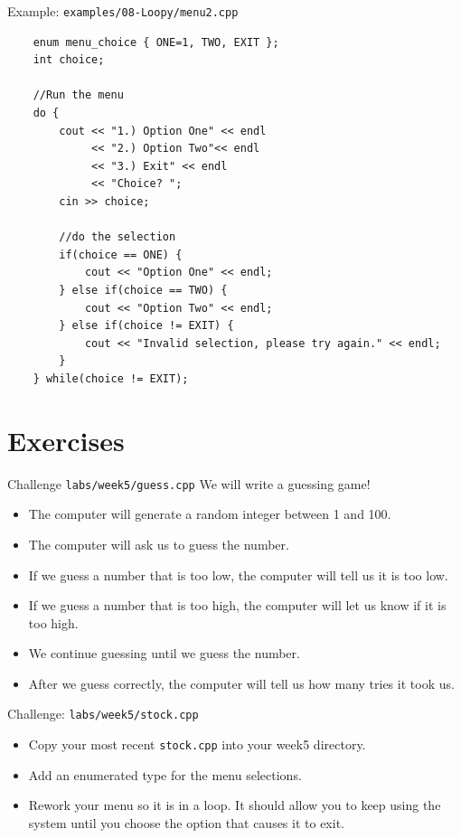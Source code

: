 \documentclass[]{beamer}
\begin{document}
\begin{frame}[fragile]{Example: \texttt{examples/08-Loopy/menu2.cpp}}
    \begin{adjustbox}{max totalheight=0.8\textheight, max width=0.9\textwidth}
        \begin{BVerbatim}
    enum menu_choice { ONE=1, TWO, EXIT };
    int choice;

    //Run the menu
    do {
        cout << "1.) Option One" << endl
             << "2.) Option Two"<< endl
             << "3.) Exit" << endl
             << "Choice? ";
        cin >> choice;

        //do the selection
        if(choice == ONE) {
            cout << "Option One" << endl;
        } else if(choice == TWO) {
            cout << "Option Two" << endl;
        } else if(choice != EXIT) {
            cout << "Invalid selection, please try again." << endl;
        }
    } while(choice != EXIT);
        \end{BVerbatim}
    \end{adjustbox}
\end{frame}


\section{Exercises}
\begin{frame}{Challenge \texttt{labs/week5/guess.cpp}}
    We will write a guessing game!
    \begin{itemize}[<+->]
        \item The computer will generate a random integer between
            1 and 100.
        \item The computer will ask us to guess the number.
        \item If we guess a number that is too low, the computer will
            tell us it is too low.
        \item If we guess a number that is too high, the computer will
            let us know if it is too high.
        \item We continue guessing until we guess the number.
        \item After we guess correctly, the computer will tell us how
            many tries it took us.
    \end{itemize}
\end{frame}


\begin{frame}{Challenge: \texttt{labs/week5/stock.cpp}}
    \begin{itemize}[<+->]
        \item Copy your most recent \texttt{stock.cpp} into your week5
            directory.
        \item Add an enumerated type for the menu selections.
        \item Rework your menu so it is in a loop.  It should allow
            you to keep using the system until you choose the option
            that causes it to exit.
    \end{itemize}
\end{frame}
\end{document}
